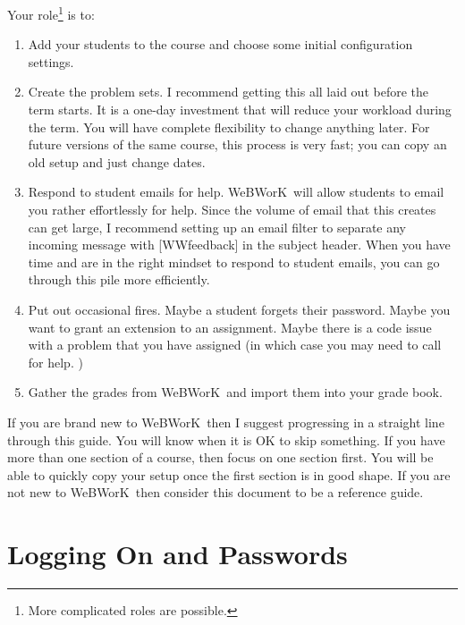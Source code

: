 \documentclass[12pt]{article}
\newcommand{\WW}{WeBWorK}
\begin{document}
Your role\footnote{More complicated roles are possible.} is to: \begin{enumerate} \item Add your students to the course and choose some initial configuration settings.
	\item Create the problem sets.
	      I recommend getting this all laid out before the term starts.
	      It is a one-day investment that will reduce your workload during the term.
	      You will have complete flexibility to change anything later.
	      For future versions of the same course, this process is very fast; you can copy an old setup and just change dates.
	\item Respond to student emails for help.  \WW\ will allow students to email you rather effortlessly for help.
	      Since the volume of email that this creates can get large, I recommend setting up an email filter to separate any incoming message with [WWfeedback] in the subject header.
	      When you have time and are in the right mindset to respond to student emails, you can go through this pile more efficiently.
	\item Put out occasional fires.
	      Maybe a student forgets their password.
	      Maybe you want to grant an extension to an assignment.
	      Maybe there is a code issue with a problem that you have assigned (in which case you may need to call for help.
	      )
	\item Gather the grades from \WW\ and import them into your grade book.
\end{enumerate}

If you are brand new to \WW\, then I suggest progressing in a straight line through this guide.
You will know when it is OK to skip something.
If you have more than one section of a course, then focus on one section first.
You will be able to quickly copy your setup once the first section is in good shape.
If you are not new to \WW\, then consider this document to be a reference guide.

\section{Logging On and Passwords}
\end{document}
